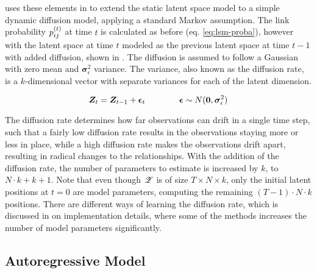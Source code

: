    \citeauthor{zangenberg2018a} uses these elements in \cite{zangenberg2018a} to extend the static latent space model to a simple dynamic diffusion model, applying a standard Markov assumption.
    The link probability $\sub(p)^\t$ at time $t$ is calculated as before (eq. \ref{eq:lsm-proba}), however with the latent space at time $t$ modeled as the previous latent space at time $t-1$ with added diffusion, shown in . The diffusion is assumed to follow a Gaussian with zero mean and $\bm{\sigma}_\epsilon^2$ variance. The variance, also known as the diffusion rate, is a $k$-dimensional vector with separate variances for each of the latent dimension.
    
    \begin{equation}\label{eq:dsnl-space}
        \bm{Z}_t = \bm{Z}_{t-1} + \bm{\epsilon}_t \qquad\qquad \bm{\epsilon} \sim N(\bm{0},\bm{\sigma}_\epsilon^2)
    \end{equation}
    
    The diffusion rate determines how far observations can drift in a single time step, such that a fairly low diffusion rate results in the observations staying more or less in place, while a high diffusion rate makes the observations drift apart, resulting in radical changes to the relationships. With the addition of the diffusion rate, the number of parameters to estimate is increased by $k$, to $N\cdot k + k + 1$. Note that even though $\bm{\mathscr{Z}}$ is of size $T\times N\times k$, only the initial latent positions at $t=0$ are model parameters, computing the remaining $(T-1)\cdot N\cdot k$ positions. 
    There are different ways of learning the diffusion rate, which is discussed in  on implementation details, where some of the methods increases the number of model parameters significantly.
    
    

\subsection{Autoregressive Model}

